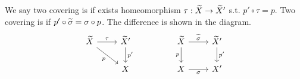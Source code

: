 \begin{definition}
	We say two covering is 
	if exists homeomorphism $\tau: \widetilde{X}\to \widetilde{X}'$ s.t. $p'\circ \tau = p$.
	Two covering is  if $p' \circ \widetilde{\sigma} = \sigma \circ p$.
	The difference is shown in the diagram.
	\begin{equation*}
	\begin{tikzcd}
		\wt{X}\drar["p"']\rar["\tau"] & \wt{X}'\dar["p'"]
		&& \wt{X}\rar["\wt{\sigma}"]\dar["p"'] & \wt{X}'\dar["p'"]\\
		& X && X\rar["\sigma"'] & X'
	\end{tikzcd}
	\end{equation*}
\end{definition}
